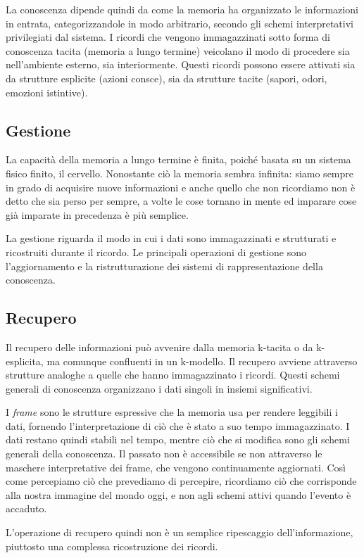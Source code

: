 La conoscenza dipende quindi da come la memoria ha organizzato le informazioni in entrata, categorizzandole in modo arbitrario, secondo gli schemi interpretativi privilegiati dal sistema. I ricordi che vengono immagazzinati sotto forma di conoscenza tacita (memoria a lungo termine) veicolano il modo di procedere sia nell’ambiente esterno, sia interiormente. Questi ricordi possono essere attivati sia da strutture esplicite (azioni consce), sia da strutture tacite (sapori, odori, emozioni istintive).

\subsection{Gestione}
La capacità della memoria a lungo termine è finita, poiché basata su un sistema fisico finito, il cervello. Nonostante ciò la memoria sembra infinita: siamo sempre in grado di acquisire nuove informazioni e anche quello che non ricordiamo non è detto che sia perso per sempre, a volte le cose tornano in mente ed imparare cose già imparate in precedenza è più semplice.

La gestione riguarda il modo in cui i dati sono immagazzinati e strutturati e ricostruiti durante il ricordo. Le principali operazioni di gestione sono l’aggiornamento e la ristrutturazione dei sistemi di rappresentazione della conoscenza.

\subsection{Recupero}
Il recupero delle informazioni può avvenire dalla memoria k-tacita o da k-esplicita, ma comunque confluenti in un k-modello. Il recupero avviene attraverso strutture analoghe a quelle che hanno immagazzinato i ricordi. Questi schemi generali di conoscenza organizzano i dati singoli in insiemi significativi.

I \emph{frame} sono le strutture espressive che la memoria usa per rendere leggibili i dati, fornendo l’interpretazione di ciò che è stato a suo tempo immagazzinato. I dati restano quindi stabili nel tempo, mentre ciò che si modifica sono gli schemi generali della conoscenza. Il passato non è accessibile se non attraverso le maschere interpretative dei frame, che vengono continuamente aggiornati. Così come percepiamo ciò che prevediamo di percepire, ricordiamo ciò che corrisponde alla nostra immagine del mondo oggi, e non agli schemi attivi quando l’evento è accaduto.

L’operazione di recupero quindi non è un semplice ripescaggio dell’informazione, piuttosto una complessa ricostruzione dei ricordi.

